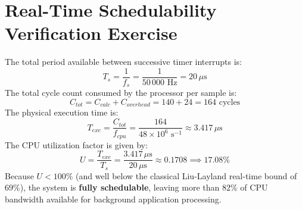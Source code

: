 \documentclass[
  lang=english,
  accent=0055A4,      %
  circuits=true,      %
  qed=smiley          %
]{opalith}
\begin{document}
\section{Real-Time Schedulability Verification Exercise}


\begin{Solution}
The total period available between successive timer interrupts is:
\[
  T_s = \frac{1}{f_s} = \frac{1}{50\,000\text{ Hz}} = 20\,\mu\text{s}
\]
The total cycle count consumed by the processor per sample is:
\[
  C_{tot} = C_{calc} + C_{overhead} = 140 + 24 = 164 \text{ cycles}
\]
The physical execution time is:
\[
  T_{exe} = \frac{C_{tot}}{f_{cpu}} = \frac{164}{48 \times 10^6\text{ s}^{-1}} \approx 3.417\,\mu\text{s}
\]
The CPU utilization factor is given by:
\[
  U = \frac{T_{exe}}{T_s} = \frac{3.417\,\mu\text{s}}{20\,\mu\text{s}} \approx 0.1708 \implies 17.08\%
\]
Because $U < 100\%$ (and well below the classical Liu-Layland real-time bound of $69\%$), the system is \textbf{fully schedulable}, leaving more than $82\%$ of CPU bandwidth available for background application processing.
\end{Solution}
\end{document}
